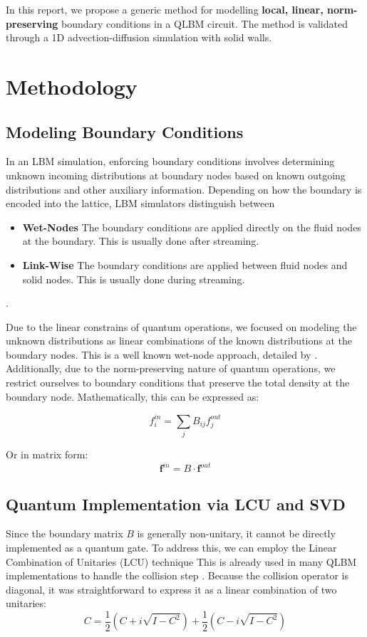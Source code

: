 \documentclass[preprint,12pt,authoryear]{elsarticle}
\begin{document}
In this report, we propose a generic method for modelling \textbf{local, linear, norm-preserving} boundary conditions in a QLBM circuit.
The method is validated through a 1D advection-diffusion simulation with solid walls.
\section{Methodology}
\label{sec:method}

\subsection{Modeling Boundary Conditions}
In an LBM simulation, enforcing boundary conditions involves determining unknown incoming distributions at boundary nodes based on known outgoing distributions and other auxiliary information.
Depending on how the boundary is encoded into the lattice, LBM simulators distinguish between
\begin{itemize}
    \item \textbf{Wet-Nodes} The boundary conditions are applied directly on the fluid nodes at the boundary. This is usually done after streaming.
    \item \textbf{Link-Wise} The boundary conditions are applied between fluid nodes and solid nodes. This is usually done during streaming.
\end{itemize} \citep{olbug:18}.

Due to the linear constrains of quantum operations, we focused on modeling the unknown distributions as linear combinations of the known distributions at the boundary nodes.
This is a well known wet-node approach, detailed by \cite{zou1997pressure}.
Additionally, due to the norm-preserving nature of quantum operations, we restrict ourselves to boundary conditions that preserve the total density at the boundary node.
Mathematically, this can be expressed as:

\begin{equation}
f_i^{in} = \sum_j B_{ij} f_j^{out}
\end{equation}

Or in matrix form:
\begin{equation}
\mathbf{f}^{in} = B \cdot \mathbf{f}^{out}
\end{equation}

\subsection{Quantum Implementation via LCU and SVD}
Since the boundary matrix $B$ is generally non-unitary, it cannot be directly implemented as a quantum gate.
To address this, we can employ the Linear Combination of Unitaries (LCU) technique \citep{childs2012hamiltonian}
This is already used in many QLBM implementations to handle the collision step \citep{budinski2021quantum}.
Because the collision operator is diagonal, it was straightforward to express it as a linear combination of two unitaries:
\begin{equation}
C = \frac{1}{2} (C + i\sqrt{I - C^2}) + \frac{1}{2}(C - i\sqrt{I - C^2})
\end{equation} 
\end{document}
